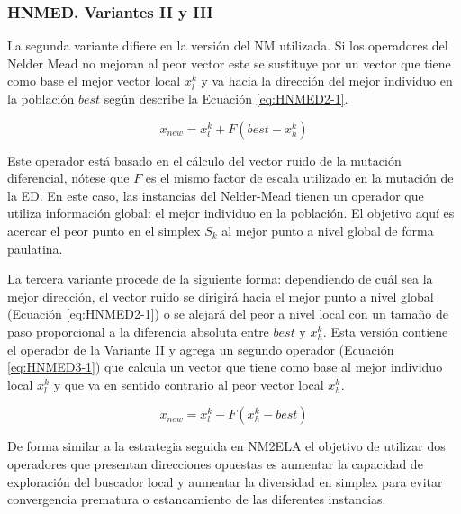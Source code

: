 \subsubsection{HNMED. Variantes II y III}
La segunda variante difiere en la versión del NM utilizada. Si los operadores del Nelder Mead no mejoran al peor vector este se sustituye por un vector que tiene como base el mejor vector local $x^k_l$ y va hacia la dirección del mejor individuo en la población $best$ según describe la Ecuación \ref{eq:HNMED2-1}.
\begin{center}
\begin{equation}\label{eq:HNMED2-1}
x_{new}= x^k_l+ F(best-x^k_h)
\end{equation}
\end{center}
Este operador está basado en el cálculo del vector ruido de la mutación diferencial, nótese que $F$ es el mismo factor de escala utilizado en la mutación de la ED. En este caso, las instancias del Nelder-Mead tienen un operador que utiliza información global: el mejor individuo en la población. El objetivo aquí es acercar el peor punto en el simplex $S_k$ al mejor punto a nivel global de forma paulatina.

La tercera variante procede de la siguiente forma: dependiendo de cuál sea la mejor dirección, el vector ruido se dirigirá hacia el mejor punto a nivel global (Ecuación \ref{eq:HNMED2-1}) o se alejará del peor a nivel local con un tamaño de paso proporcional a la diferencia absoluta entre $best$ y $x^k_h$. Esta versión contiene el operador de la Variante II y agrega  un segundo operador (Ecuación \ref{eq:HNMED3-1}) que calcula un vector que tiene como base al mejor individuo local $x^k_l$ y que va en sentido contrario al peor vector local $x^k_h$.
\begin{center}
\begin{equation}\label{eq:HNMED3-1}
x_{new}= x^k_l- F(x^k_h-best)
\end{equation}
\end{center}
De forma similar a la estrategia seguida en NM2ELA el objetivo de utilizar dos operadores que presentan direcciones opuestas es aumentar la capacidad de exploración del buscador local y aumentar la diversidad en simplex para evitar convergencia prematura o estancamiento de las diferentes instancias.
